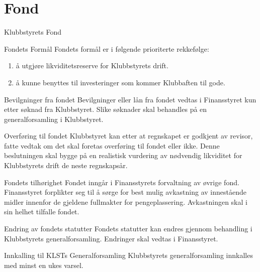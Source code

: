 \chapter*{Fond}

\begin{fond}{Klubbstyrets Fond}
    \begin{fondsparagraf}{Fondets Formål}
        Fondets formål er i følgende prioriterte rekkefølge:
        \begin{enumerate}
            \item å utgjøre likviditetsreserve for Klubbstyrets drift.
            \item å kunne benyttes til investeringer som kommer Klubbaften til gode.
        \end{enumerate}
    \end{fondsparagraf}

    \begin{fondsparagraf}{Bevilgninger fra fondet}
        Bevilgninger eller lån fra fondet vedtas i Finansstyret kun etter søknad fra
        Klubbstyret. Slike søknader skal behandles på en generalforsamling i Klubbstyret.
    \end{fondsparagraf}

    \begin{fondsparagraf}{Overføring til fondet}
Klubbstyret kan etter at regnskapet er godkjent av revisor, fatte vedtak om det skal foretas overføring til fondet eller
ikke. Denne beslutningen skal bygge på en realistisk vurdering av nødvendig likviditet for Klubbstyrets drift de neste
regnskapsår.
    \end{fondsparagraf}
    
    \begin{fondsparagraf}{Fondets tilhørighet}
Fondet inngår i Finansstyrets forvaltning av øvrige fond. Finansstyret forplikter seg til å sørge for best mulig
avkastning av innestående midler innenfor de gjeldene fullmakter for pengeplassering. Avkastningen skal i sin helhet
tilfalle fondet.
    \end{fondsparagraf}
    
    \begin{fondsparagraf}{Endring av fondets statutter}
Fondets statutter kan endres gjennom behandling i Klubbstyrets generalforsamling. Endringer skal vedtas i
Finansstyret.
    \end{fondsparagraf}
    
    \begin{fondsparagraf}{Innkalling til KLSTs Generalforsamling}
Klubbstyrets generalforsamling innkalles med minst en ukes varsel.
    \end{fondsparagraf}

\end{fond}



